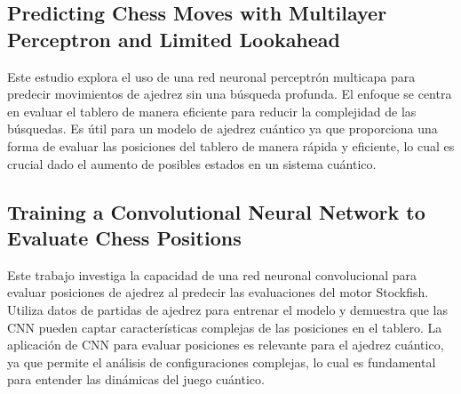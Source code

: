 \subsection{Predicting Chess Moves with Multilayer Perceptron and Limited Lookahead}

Este estudio explora el uso de una red neuronal perceptrón multicapa para predecir
movimientos de ajedrez sin una búsqueda profunda. El enfoque se centra en evaluar el
tablero de manera eficiente para reducir la complejidad de las búsquedas. Es útil para un
modelo de ajedrez cuántico ya que proporciona una forma de evaluar las posiciones del
tablero de manera rápida y eficiente, lo cual es crucial dado el aumento de posibles
estados en un sistema cuántico.\cite{mehta2020predicting}

\subsection{Training a Convolutional Neural Network to Evaluate Chess Positions}

Este trabajo investiga la capacidad de una red neuronal convolucional para evaluar
posiciones de ajedrez al predecir las evaluaciones del motor Stockfish. Utiliza datos de
partidas de ajedrez para entrenar el modelo y demuestra que las CNN pueden captar
características complejas de las posiciones en el tablero. La aplicación de CNN para
evaluar posiciones es relevante para el ajedrez cuántico, ya que permite el análisis de
configuraciones complejas, lo cual es fundamental para entender las dinámicas del juego
cuántico.\cite{vikstrom2019training}